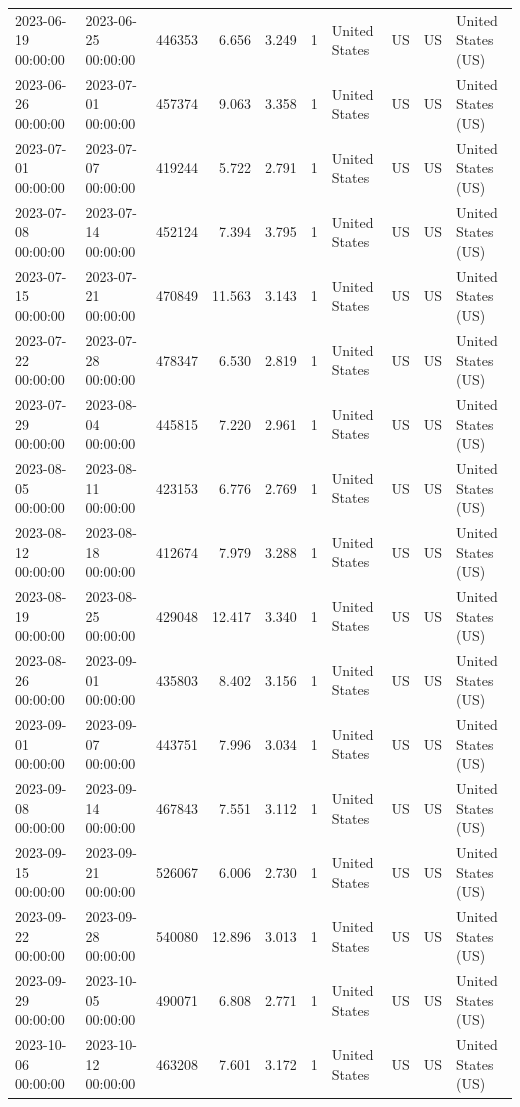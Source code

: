 \begin{tabular}{llrrrlllll}
2023-06-19 00:00:00 & 2023-06-25 00:00:00 & 446353 & 6.656 & 3.249 & 1 & United States & US & US & United States (US) \\
2023-06-26 00:00:00 & 2023-07-01 00:00:00 & 457374 & 9.063 & 3.358 & 1 & United States & US & US & United States (US) \\
2023-07-01 00:00:00 & 2023-07-07 00:00:00 & 419244 & 5.722 & 2.791 & 1 & United States & US & US & United States (US) \\
2023-07-08 00:00:00 & 2023-07-14 00:00:00 & 452124 & 7.394 & 3.795 & 1 & United States & US & US & United States (US) \\
2023-07-15 00:00:00 & 2023-07-21 00:00:00 & 470849 & 11.563 & 3.143 & 1 & United States & US & US & United States (US) \\
2023-07-22 00:00:00 & 2023-07-28 00:00:00 & 478347 & 6.530 & 2.819 & 1 & United States & US & US & United States (US) \\
2023-07-29 00:00:00 & 2023-08-04 00:00:00 & 445815 & 7.220 & 2.961 & 1 & United States & US & US & United States (US) \\
2023-08-05 00:00:00 & 2023-08-11 00:00:00 & 423153 & 6.776 & 2.769 & 1 & United States & US & US & United States (US) \\
2023-08-12 00:00:00 & 2023-08-18 00:00:00 & 412674 & 7.979 & 3.288 & 1 & United States & US & US & United States (US) \\
2023-08-19 00:00:00 & 2023-08-25 00:00:00 & 429048 & 12.417 & 3.340 & 1 & United States & US & US & United States (US) \\
2023-08-26 00:00:00 & 2023-09-01 00:00:00 & 435803 & 8.402 & 3.156 & 1 & United States & US & US & United States (US) \\
2023-09-01 00:00:00 & 2023-09-07 00:00:00 & 443751 & 7.996 & 3.034 & 1 & United States & US & US & United States (US) \\
2023-09-08 00:00:00 & 2023-09-14 00:00:00 & 467843 & 7.551 & 3.112 & 1 & United States & US & US & United States (US) \\
2023-09-15 00:00:00 & 2023-09-21 00:00:00 & 526067 & 6.006 & 2.730 & 1 & United States & US & US & United States (US) \\
2023-09-22 00:00:00 & 2023-09-28 00:00:00 & 540080 & 12.896 & 3.013 & 1 & United States & US & US & United States (US) \\
2023-09-29 00:00:00 & 2023-10-05 00:00:00 & 490071 & 6.808 & 2.771 & 1 & United States & US & US & United States (US) \\
2023-10-06 00:00:00 & 2023-10-12 00:00:00 & 463208 & 7.601 & 3.172 & 1 & United States & US & US & United States (US) \\

\end{tabular}
